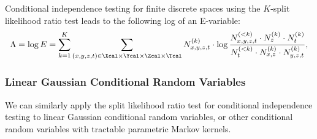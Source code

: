 Conditional independence testing for finite discrete spaces using the $K$-split likelihood ratio test
 leads to the following log of an E-variable:
\begin{align*}
    \Lambda = \log E = \sum_{k=1}^K \sum_{(x,y,z,t) \in \Xcal\times\Ycal\times\Zcal\times\Tcal}  N^{(k)}_{x,y,z,t} \cdot  \log \frac{N_{x,y,z,t}^{(<k)} \cdot N_z^{(k)} \cdot N_t^{(k)}}{N_{t}^{(<k)} \cdot N_{x,z}^{(k)} \cdot N_{y,z,t}^{(k)}},
\end{align*}


\subsubsection{Linear Gaussian Conditional Random Variables}

We can similarly apply the split likelihood ratio test for conditional independence testing 
to linear Gaussian conditional random variables, 
or other conditional random variables with tractable parametric Markov kernels.

